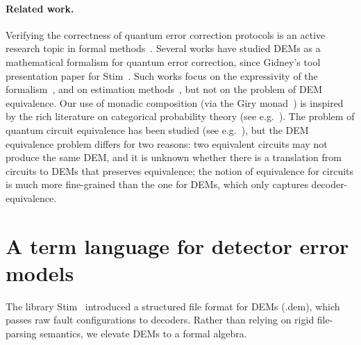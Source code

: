 \documentclass[11pt,a4paper]{article}
\begin{document}
\paragraph{Related work.} 
Verifying the correctness of quantum error correction protocols is an active research topic in formal methods~\cite{carette2019szx,chareton2026hybrid,chen2025verifyingftqc,sundaram2025hoaremeetsheisenberg,huang2026,fang2024symbolic,mei2024eqcheckmodelcounting}.
Several works have studied DEMs as a mathematical formalism for quantum error correction, since Gidney's tool presentation paper for Stim~\cite{gidney2021stim}. 
Such works focus on the expressivity of the formalism~\cite{derks2025designingFTQC}, and on estimation methods~\cite{arms2026demwillow,blumekohout2025estimating,takou2025estimatingdecodingcoherenterrors}, but not on the problem of DEM equivalence. Our use of monadic composition (via the Giry monad~\cite{giry1982categorical}) is inspired by the rich literature on categorical probability theory (see e.g.~\cite{jia2021commutativemonads,affeldt2020trustful,moggi1991notions,Fritz2020}).
The problem of quantum circuit equivalence has been studied (see e.g.~\cite{peham2022equivalenceZX,wille2009,huang2026,yamashita2010fastecqc,mei2024eqcheckmodelcounting,rodatz2026faulttoleranceconstruction}), but the DEM equivalence problem differs for two reasons: two equivalent circuits may not produce the same DEM, and it is unknown whether there is a translation from circuits to DEMs that preserves equivalence; the notion of equivalence for circuits is much more fine-grained than the one for DEMs, which only captures decoder-equivalence.

\section{A term language for detector error models}
\label{sec:terms}

The library Stim~\cite{gidney2021stim} introduced a structured file format for DEMs (.dem), which passes raw fault configurations to decoders. Rather than relying on rigid file-parsing semantics, we elevate DEMs to a formal algebra.
\end{document}

